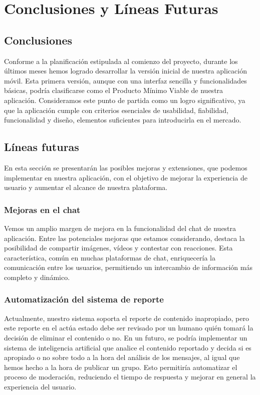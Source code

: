\chapter{Conclusiones y Líneas Futuras}
    \section{Conclusiones}
        Conforme a la planificación estipulada al comienzo del proyecto, durante los últimos meses hemos logrado desarrollar la versión inicial de nuestra aplicación móvil. Esta primera versión, aunque con una interfaz sencilla y funcionalidades básicas, podría clasificarse como el Producto Mínimo Viable\cite{REF6} de nuestra aplicación. Consideramos este punto de partida como un logro significativo, ya que la aplicación cumple con criterios esenciales de usabilidad, fiabilidad, funcionalidad y diseño, elementos suficientes para introducirla en el mercado.

        \section{Líneas futuras}
            En esta sección se presentarán las posibles mejoras y extensiones, que podemos implementar en nuestra aplicación, con el objetivo de mejorar la experiencia de usuario y aumentar el alcance de nuestra plataforma.
  
        \subsection{Mejoras en el chat}
            Vemos un amplio margen de mejora en la funcionalidad del chat de nuestra aplicación. Entre las potenciales mejoras que estamos considerando, destaca la posibilidad de compartir imágenes, vídeos y contestar con reacciones. Esta característica, común en muchas plataformas de chat, enriquecería la comunicación entre los usuarios, permitiendo un intercambio de información más completo y dinámico.
            
        \subsection{Automatización del sistema de reporte}
            Actualmente, nuestro sistema soporta el reporte de contenido inapropiado, pero este reporte en el actúa estado debe ser revisado por un humano quién tomará la decisión de eliminar el contenido o no. En un futuro, se podría implementar un sistema de inteligencia artificial que analice el contenido reportado y decida si es apropiado o no sobre todo a la hora del análisis de los mensajes, al igual que hemos hecho a la hora de publicar un grupo. Esto permitiría automatizar el proceso de moderación, reduciendo el tiempo de respuesta y mejorar en general la experiencia del usuario.

